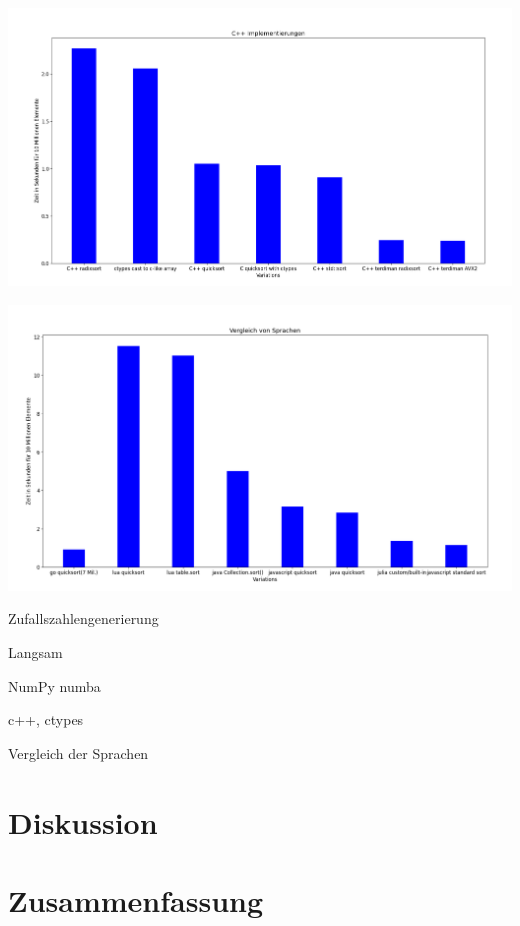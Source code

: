 \documentclass[12pt,a4paper]{article}
\begin{document}
\begin{center}
    \hspace*{-3cm}\includegraphics[width=1.4\textwidth]{./diagramme/matplotlib/cpp.png}
\end{center}

\begin{center}
    \hspace*{-3cm}\includegraphics[width=1.4\textwidth]{./diagramme/matplotlib/comparison.png}
\end{center}

Zufallszahlengenerierung

Langsam

NumPy numba

c++, ctypes

Vergleich der Sprachen

\clearpage
\section{Diskussion}
\clearpage
\section{Zusammenfassung}

\clearpage

\printbibliography[title={Literaturverzeichnis}]
\end{document}

